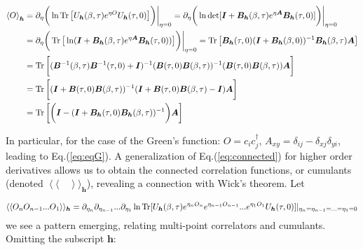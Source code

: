 \begin{equation}\label{eq:connected}
\begin{split}
\left\langle O \right\rangle_{\bm h} &= \partial_\eta \bigg( \ln \operatorname{Tr} \big[ U_{\bm h} (\beta, \tau ) e^{\eta O} U_{\bm h} (\tau, 0) \big] \bigg) \bigg|_{\eta = 0} = \partial_\eta \bigg( \ln \det [ \bm I + \bm B_{\bm h} ( \beta, \tau ) e^{\eta \bm A} \bm B_{\bm h} (\tau, 0)  ] \bigg) \bigg|_{\eta = 0} \\
&=  \partial_\eta \bigg( \operatorname{Tr} \big[  \ln  ( \bm I + \bm B_{\bm h} ( \beta, \tau ) e^{\eta \bm A} \bm B_{\bm h} (\tau, 0)  ) \big] \bigg) \bigg|_{\eta = 0} = \operatorname{Tr} \big[ \bm B_{\bm h} (\tau, 0) ( \bm I + \bm B_{\bm h} ( \beta, 0 ) )^{-1} \bm B_{\bm h} ( \beta, \tau ) \bm A \big] \\
&= \operatorname{Tr} \bigg[ ( \bm B^{-1} (\beta, \tau) \bm B^{-1} (\tau, 0) + \bm I )^{-1} ( \bm B (\tau, 0) \bm B (\beta, \tau) )^{-1} ( \bm B (\tau, 0) \bm B (\beta, \tau) ) \bm A \bigg]  \\
&= \operatorname{Tr} \bigg[ ( \bm I + \bm B ( \tau, 0 ) \bm B ( \beta, \tau ) )^{-1} ( \bm I +  \bm B ( \tau, 0 ) \bm B ( \beta, \tau ) - \bm I ) \bm A \bigg] \\
&= \operatorname{Tr} \bigg[  \bigg( \bm I - ( \bm I + \bm B_{\bm h} ( \tau, 0 ) \bm B_{\bm h} (\beta, \tau) )^{-1} \bigg) \bm A \bigg]
\end{split}
\end{equation}

In particular, for the case of the Green's function: $O = c_i c_j^\dagger$, $A_{xy} = \delta_{i j} - \delta_{xj} \delta_{yi}$, leading to Eq.(\ref{eq:eqG}).
A generalization of Eq.(\ref{eq:connected}) for higher order derivatives allows us to obtain the connected correlation functions, or cumulants (denoted $\left\langle\langle \quad \right\rangle\rangle_{\bm h}$), revealing a connection with Wick's theorem.
Let

\begin{equation}
\left\langle\langle O_n O_{n-1}... O_1  \right\rangle\rangle_{\bm h} = \partial_{\eta_n} \partial_{\eta_{n-1}} ... \partial_{\eta_1} \ln \operatorname{Tr} [ U_{\bm h} (\beta, \tau ) e^{\eta_n O_n} e^{\eta_{n-1} O_{n-1}} ... e^{\eta_1 O_1} U_{\bm h} (\tau, 0) ] |_{\eta_n = \eta_{n-1} =...= \eta_1 = 0}
\end{equation}
we see a pattern emerging, relating multi-point correlators and cumulants.
Omitting the subscript $\bm h$:

